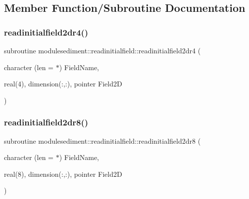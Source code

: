 \subsection{Member Function/\+Subroutine Documentation}
\mbox{\label{interfacemodulesediment_1_1readinitialfield_a60740041aa04aed49a6a61cdcbe52848}} 
\subsubsection{\texorpdfstring{readinitialfield2dr4()}{readinitialfield2dr4()}}
{\footnotesize\ttfamily subroutine modulesediment\+::readinitialfield\+::readinitialfield2dr4 (\begin{DoxyParamCaption}\item[{character (len = $\ast$)}]{Field\+Name,  }\item[{real(4), dimension(\+:,\+:), pointer}]{Field2D }\end{DoxyParamCaption})\hspace{0.3cm}{\ttfamily [private]}}

\mbox{\label{interfacemodulesediment_1_1readinitialfield_ae212d0eef3a37f7d34ae1d00a7c4722d}} 
\subsubsection{\texorpdfstring{readinitialfield2dr8()}{readinitialfield2dr8()}}
{\footnotesize\ttfamily subroutine modulesediment\+::readinitialfield\+::readinitialfield2dr8 (\begin{DoxyParamCaption}\item[{character (len = $\ast$)}]{Field\+Name,  }\item[{real(8), dimension(\+:,\+:), pointer}]{Field2D }\end{DoxyParamCaption})\hspace{0.3cm}{\ttfamily [private]}}

